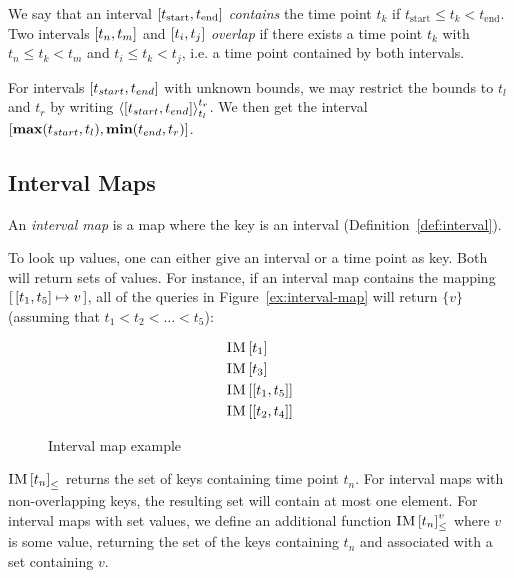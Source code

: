 We say that an interval $\interval{t_\text{start}}{t_\text{end}}$ \emph{contains} the time point $t_k$ if $t_\text{start} \leq t_k < t_\text{end}$. Two intervals $\interval{t_n}{t_m}$ and $\interval{t_i}{t_j}$ \emph{overlap} if there exists a time point $t_k$ with $t_n \leq t_k < t_m$ and $t_i \leq t_k < t_j$, i.e. a time point contained by both intervals.

For intervals $\interval{t_{start}}{t_{end}}$ with unknown bounds, we may restrict the bounds to $t_l$ and $t_r$ by writing $\clamp{\interval{t_{start}}{t_{end}}}{t_l}{t_r}$. We then get the interval $\interval{\textbf{max}(t_{start}, t_l)}{\textbf{min}(t_{end}, t_r)}$.

\subsection{Interval Maps}
\label{sub:interval-maps}
\begin{definition}
An \emph{interval map} is a map where the key is an interval (Definition~\vref{def:interval}). 
  \label{def:interval-map}
\end{definition}

To look up values, one can either give an interval or a time point as key. Both will return sets of values. For instance, if an interval map  contains the mapping $\intervalmapping{t_1}{t_5}{v}$, all of the queries in Figure~\vref{ex:interval-map} will return $\{v\}$ (assuming that $t_1 < t_2 < \ldots < t_5$):

\begin{figure}[h]
  \begin{align*}
    & \lookup{\map{IM}}{t_1} \\
    & \lookup{\map{IM}}{t_3} \\
    & \lookup{\map{IM}}{\interval{t_1}{t_5}} \\
    & \lookup{\map{IM}}{\interval{t_2}{t_4}}
  \end{align*}
  \caption{Interval map example}
  \label{ex:interval-map}
\end{figure}

${\textsc{IM} \left[ t_n \right]}_{\leq}$ returns the set of keys containing time point $t_n$. For interval maps with non-overlapping keys, the resulting set will contain at most one element. For interval maps with set values, we define an additional function ${\textsc{IM} \left[ t_n \right]^{v}_{\leq}}$ where $v$ is some value, returning the set of the keys containing $t_n$ and associated with a set containing $v$. 

